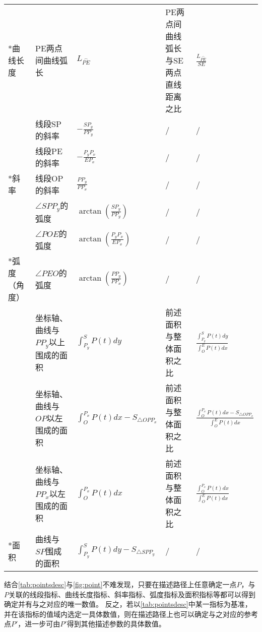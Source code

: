 \begin{center}
\begin{longtable}{m{1.57cm}<{\centering}m{4.07cm}<{\centering}m{2.07cm}<{\centering}m{4.07cm}<{\centering}m{2.67cm}<{\centering}}
         \multirow{-2}*{曲线长度} &  PE两点间曲线弧长   &   $L_{\overset{\frown}{PE}}$    &    PE两点间曲线弧长与SE两点直线距离之比  &  $\frac{L_{\overset{\frown}{PE}}}{SE}$\\
                                     &  线段SP的斜率     &  $-\frac{SP_y}{PP_y}$     &   /    &  /  \\
                                     &  线段PE的斜率     &   $-\frac{P_yP_x}{EP_x}$    &    /  &  /   \\
         \multirow{-3}*{斜率}        &  线段OP的斜率    &    $\frac{PP_y}{PP_x}$   &    /   &  /     \\
                                     &  $\angle SPP_y$的弧度      & $\arctan(\frac{SP_y}{PP_y})$     &    /  &  /   \\
                                     &   $\angle POE$的弧度    &  $\arctan(\frac{P_yP_x}{EP_x})$      &    /  &  /   \\
         \multirow{-3}*{弧度（角度）}&   $\angle PEO$的弧度   &  $\arctan(\frac{PP_y}{PP_x})$         &    /  &  /   \\
                                     &    坐标轴、曲线与$PP_y$以上围成的面积   &  $\int_{P_y}^{S}{P(t)dy} $     &   前述面积与整体面积之比    & $\frac{\int_{P_y}^{S}{P(t)dy}}{\int_O^E{P(t)dx}}$ \\
                                     &   坐标轴、曲线与$OP$以左围成的面积   &    $\int_{O}^{P_x}{P(t)dx}-S_{\triangle OPP_x}$   &  前述面积与整体面积之比     & $\frac{\int_{O}^{P_x}{P(t)dx}-S_{\triangle OPP_x}}{\int_O^E{P(t)dx}}$ \\
                                     &   坐标轴、曲线与$PP_x$以左围成的面积   &   $\int_{O}^{P_x}{P(t)dx}$    &  前述面积与整体面积之比     & $\frac{\int_{O}^{P_x}{P(t)dx}}{\int_O^E{P(t)dx}}$ \\
         \multirow{-4}*{面积}        &    曲线与$SP$围成的面积   &   $\int_{P_y}^{S}{P(t)dy}-S_{\triangle SPP_y} $    &   /    &  /\\
	\end{longtable}
\end{center}
\vspace{-0.8cm}

结合\autoref{tab:pointsdesc}与\autoref{fig:point}不难发现，只要在描述路径上任意确定一点$P$，与$P$关联的线段指标、曲线长度指标、斜率指标、弧度指标及面积指标等都可以得到确定并有与之对应的唯一数值。
反之，若以\autoref{tab:pointsdesc}中某一指标为基准，并在该指标的值域内选定一具体数值，则在描述路径上也可以确定与之对应的参考点$P'$，进一步可由$P'$得到其他描述参数的具体数值。

